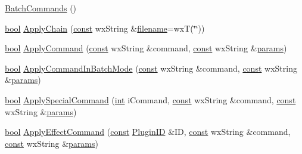 \begin{DoxyCompactItemize}
\item 
\hyperlink{class_batch_commands_a79b57eef3a3f8e3386528ebf98c69eb9}{Batch\+Commands} ()
\item 
\hyperlink{mac_2config_2i386_2lib-src_2libsoxr_2soxr-config_8h_abb452686968e48b67397da5f97445f5b}{bool} \hyperlink{class_batch_commands_a01e880b30f49467b66c79edf1cd7a81a}{Apply\+Chain} (\hyperlink{getopt1_8c_a2c212835823e3c54a8ab6d95c652660e}{const} wx\+String \&\hyperlink{test__portburn_8cpp_a7efa5e9c7494c7d4586359300221aa5d}{filename}=wxT(\char`\"{}\char`\"{}))
\item 
\hyperlink{mac_2config_2i386_2lib-src_2libsoxr_2soxr-config_8h_abb452686968e48b67397da5f97445f5b}{bool} \hyperlink{class_batch_commands_a40e06fade6de517be1115d6a256b1fcd}{Apply\+Command} (\hyperlink{getopt1_8c_a2c212835823e3c54a8ab6d95c652660e}{const} wx\+String \&command, \hyperlink{getopt1_8c_a2c212835823e3c54a8ab6d95c652660e}{const} wx\+String \&\hyperlink{_reverb_8cpp_aacc5617877d2aa4d17c729c1c8ba4eec}{params})
\item 
\hyperlink{mac_2config_2i386_2lib-src_2libsoxr_2soxr-config_8h_abb452686968e48b67397da5f97445f5b}{bool} \hyperlink{class_batch_commands_a8fbdba411ed6d095065c569e92a8a3dd}{Apply\+Command\+In\+Batch\+Mode} (\hyperlink{getopt1_8c_a2c212835823e3c54a8ab6d95c652660e}{const} wx\+String \&command, \hyperlink{getopt1_8c_a2c212835823e3c54a8ab6d95c652660e}{const} wx\+String \&\hyperlink{_reverb_8cpp_aacc5617877d2aa4d17c729c1c8ba4eec}{params})
\item 
\hyperlink{mac_2config_2i386_2lib-src_2libsoxr_2soxr-config_8h_abb452686968e48b67397da5f97445f5b}{bool} \hyperlink{class_batch_commands_aed7516f5c70712edf5ab97488fc86665}{Apply\+Special\+Command} (\hyperlink{xmltok_8h_a5a0d4a5641ce434f1d23533f2b2e6653}{int} i\+Command, \hyperlink{getopt1_8c_a2c212835823e3c54a8ab6d95c652660e}{const} wx\+String \&command, \hyperlink{getopt1_8c_a2c212835823e3c54a8ab6d95c652660e}{const} wx\+String \&\hyperlink{_reverb_8cpp_aacc5617877d2aa4d17c729c1c8ba4eec}{params})
\item 
\hyperlink{mac_2config_2i386_2lib-src_2libsoxr_2soxr-config_8h_abb452686968e48b67397da5f97445f5b}{bool} \hyperlink{class_batch_commands_a4c89549b21acab81480b8d522da1d3f3}{Apply\+Effect\+Command} (\hyperlink{getopt1_8c_a2c212835823e3c54a8ab6d95c652660e}{const} \hyperlink{include_2audacity_2_types_8h_abe9b737fcebc2b5bea606246e1eab52e}{Plugin\+ID} \&ID, \hyperlink{getopt1_8c_a2c212835823e3c54a8ab6d95c652660e}{const} wx\+String \&command, \hyperlink{getopt1_8c_a2c212835823e3c54a8ab6d95c652660e}{const} wx\+String \&\hyperlink{_reverb_8cpp_aacc5617877d2aa4d17c729c1c8ba4eec}{params})

\end{DoxyCompactItemize}
